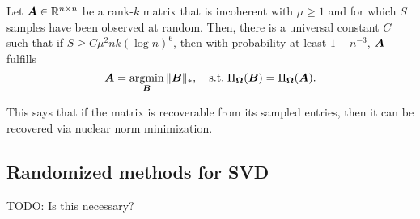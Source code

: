 \begin{theorem}
    Let $\bm{A} \in \mathbb{R}^{n \times n}$ be a rank-$k$ matrix that is incoherent with $\mu \geq 1$ and
    for which $S$ samples have been observed at random. Then, there is a universal constant $C$ such
    that if $S \geq C \mu^2 nk (\log n)^6$, then with probability at least $1 - n^{-3}$, $\bm{A}$
    fulfills \[
        \bm{A} = \operatorname*{argmin}_{\bm{B}} \| \bm{B} \|_*, \quad \mathrm{s.t.}\; \Pi_{\bm{\Omega}}(\bm{B}) = \Pi_{\bm{\Omega}}(\bm{A}).
    \]
\end{theorem}

This says that if the matrix is recoverable from its sampled entries, then it can be recovered via
nuclear norm minimization.

\subsection{Randomized methods for SVD}

TODO: Is this necessary?
